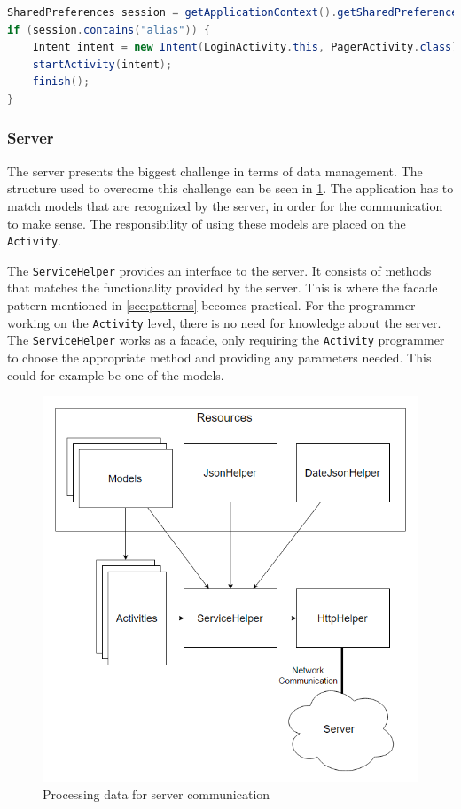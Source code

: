 \begin{lstlisting}[language=java, label={lst:login_check}, caption={Checking whether the user should login}]
SharedPreferences session = getApplicationContext().getSharedPreferences(getString(R.string.app_name), 0);
if (session.contains("alias")) {
    Intent intent = new Intent(LoginActivity.this, PagerActivity.class);
    startActivity(intent);
    finish();
}
\end{lstlisting}  

\subsubsection{Server}
The server presents the biggest challenge in terms of data management. The structure used to overcome this challenge can be seen in \ref{fig:application_dataflow}. The application has to match models that are recognized by the server, in order for the communication to make sense. The responsibility of using these models are placed on the \texttt{Activity}.

The \texttt{ServiceHelper} provides an interface to the server. It consists of methods that matches the functionality provided by the server. This is where the facade pattern mentioned in \ref{sec:patterns} becomes practical. For the programmer working on the \texttt{Activity} level, there is no need for knowledge about the server. The \texttt{ServiceHelper} works as a facade, only requiring the \texttt{Activity} programmer to choose the appropriate method and providing any parameters needed. This could for example be one of the models.

\begin{figure}[H]
	\centering
	\includegraphics[width=\textwidth]{Pictures/application_dataflow.png}
	\caption{Processing data for server communication}
	\label{fig:application_dataflow}
\end{figure}

